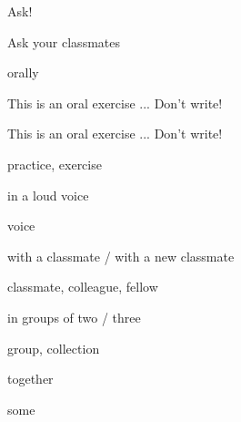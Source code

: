 \cardfrontfoot{}
\begin{flashcard}{\LARGE Ask!}
\LARGE {}
\end{flashcard}
\cardfrontfoot{}
\begin{flashcard}{\LARGE Ask your classmates}
\LARGE {}
\end{flashcard}
\cardfrontfoot{}
\begin{flashcard}{\LARGE orally}
\LARGE {}
\end{flashcard}
\cardfrontfoot{}
\begin{flashcard}{\LARGE This is an oral exercise ... Don't write!}
\LARGE {}
\end{flashcard}
\cardfrontfoot{}
\begin{flashcard}{\LARGE This is an oral exercise ... Don't write!}
\LARGE {}
\end{flashcard}
\cardfrontfoot{}
\begin{flashcard}{\LARGE practice, exercise}
\LARGE {}
\end{flashcard}
\cardfrontfoot{}
\begin{flashcard}{\LARGE in a loud voice}
\LARGE {}
\end{flashcard}
\cardfrontfoot{}
\begin{flashcard}{\LARGE voice}
\LARGE {}
\end{flashcard}
\cardfrontfoot{}
\begin{flashcard}{\LARGE with a classmate / with a new classmate}
\LARGE {}
\end{flashcard}
\cardfrontfoot{}
\begin{flashcard}{\LARGE classmate, colleague, fellow}
\LARGE {}
\end{flashcard}
\cardfrontfoot{}
\begin{flashcard}{\LARGE in groups of two / three}
\LARGE {}
\end{flashcard}
\cardfrontfoot{}
\begin{flashcard}{\LARGE group, collection}
\LARGE {}
\end{flashcard}
\cardfrontfoot{}
\begin{flashcard}{\LARGE together}
\LARGE {}
\end{flashcard}
\cardfrontfoot{}
\begin{flashcard}{\LARGE some}
\LARGE {}
\end{flashcard}
